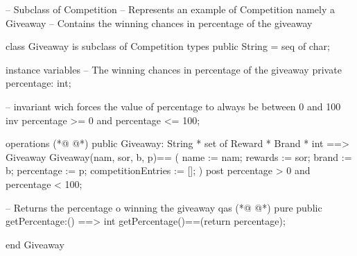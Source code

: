 \begin{vdmpp}[breaklines=true]
-- Subclass of Competition
-- Represents an example of Competition namely a Giveaway
-- Contains the winning chances in percentage of the giveaway

class Giveaway is subclass of Competition
 types
    public String = seq of char;
        
    instance variables
    -- The winning chances in percentage of the giveaway
     private percentage: int;
     
    -- invariant wich forces the value of percentage to always be between 0 and 100
  inv percentage >= 0 and percentage <= 100;
    
  operations 
(*@
\label{Giveaway:17}
@*)
      public Giveaway: String * set of Reward * Brand * int ==> Giveaway
     Giveaway(nam, sor, b, p)==
     (
     name := nam;
     rewards := sor;
     brand := b;
     percentage := p;
     competitionEntries := [];
     )
     post percentage > 0 and percentage < 100;
      
      -- Returns the percentage o winning the giveaway qas      
(*@
\label{getPercentage:29}
@*)
     pure public getPercentage:() ==> int
     getPercentage()==(return percentage);
     
end Giveaway
\end{vdmpp}
